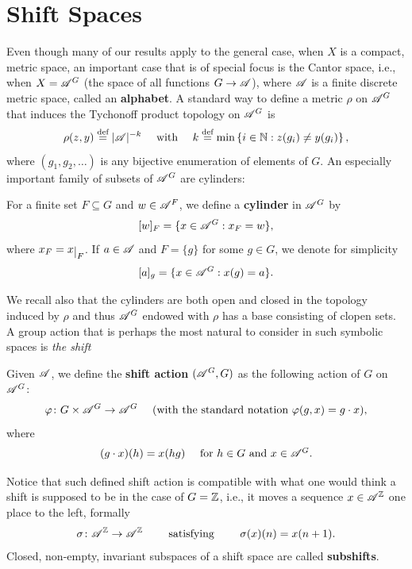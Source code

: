 
\section{Shift Spaces}
Even though many of our results apply to the general case, when $X$ is a compact, metric space, an important case that is of special focus is the Cantor space, i.e., when $X=\mathscr{A}^G$ (the space of all functions $G\to \mathscr{A}$), where $\mathscr{A}$ is a finite discrete metric space, called an {\bf alphabet}. A standard way to define a metric $\rho$ on $\mathscr{A}^G$ that induces the Tychonoff product topology on $\mathscr{A}^G$ is
\begin{equation}\label{eq:cantorMetric}
\rho(z,y)\stackrel{\textup{def}}{=} |\mathscr{A}|^{-k}\quad\text{ with } \quad k\stackrel{\textup{def}}{=}  \min\left\{i\in\mathbb{N}: z(g_i)\neq y(g_i)\right\},
\end{equation}
where $(g_1,g_2,\ldots)$ is any bijective enumeration of elements of $G$. An especially important family of subsets of $\mathscr{A}^G$ are cylinders:

\begin{defn}[Cylinder]\label{def:cylinder}
For a finite set $F\subseteq G$ and $w\in\mathscr{A}^F$, we define a {\bf cylinder} in $\mathscr{A}^G$ by
\[
[w]_F = \{x\in\mathscr{A}^G: x_F = w\},
\]
where $x_F = x\restrict{F}$. If $a\in\mathscr{A}$ and $F=\{g\}$ for some $g\in G$, we denote for simplicity
\[
[a]_g = \{x\in\mathscr{A}^G: x(g) = a\}.
\]
\end{defn}
\noindent
We recall also that the cylinders are both open and closed in the topology induced by $\rho$ and thus $\mathscr{A}^G$ endowed with $\rho$ has a base consisting of clopen sets.
%
A group action that is perhaps the most natural to consider in such symbolic spaces is \emph{the shift}

\begin{defn}
Given $\mathscr{A}$, we define the {\bf shift action} $(\mathscr{A}^G,G)$ as the following action of $G$ on $\mathscr{A}^G$:
\[
\varphi\colon G\times \mathscr{A}^G \to \mathscr{A}^G \quad \text{ (with the standard notation } \varphi(g,x)=g\cdot x),
\]
where
\[
(g\cdot x)(h) = x(hg) \quad \mbox{ for $h\in G$ and $x\in\mathscr{A}^G$}.
\]
\end{defn}

\noindent
Notice that such defined shift action is compatible with what one would think a shift is supposed to be in the case of $G=\mathbb{Z}$, i.e., it moves a sequence $x\in\mathscr{A}^{\mathbb{Z}}$ one place to the left, formally
\[
\sigma\colon \mathscr{A}^{\mathbb{Z}}\to\mathscr{A}^{\mathbb{Z}} ~~~~~~\text{ satisfying }~~~~~~ \sigma(x)(n) = x(n+1).
\] 
Closed, non-empty, invariant subspaces of a shift space are called {\bf subshifts}.





